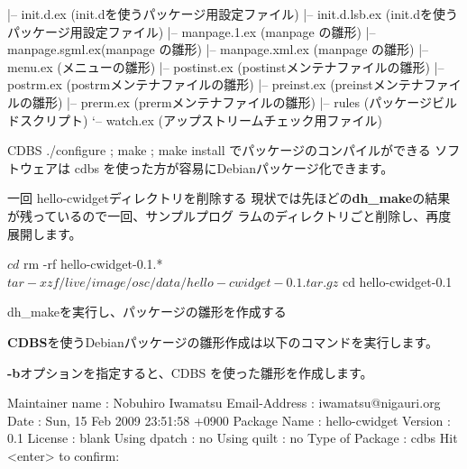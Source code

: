 \begin{frame}[containsverbatim]
\begin{commandline}
|-- init.d.ex      (init.dを使うパッケージ用設定ファイル)
|-- init.d.lsb.ex  (init.dを使うパッケージ用設定ファイル)
|-- manpage.1.ex   (manpage の雛形)
|-- manpage.sgml.ex(manpage の雛形)
|-- manpage.xml.ex (manpage の雛形)
|-- menu.ex        (メニューの雛形)
|-- postinst.ex    (postinstメンテナファイルの雛形)
|-- postrm.ex      (postrmメンテナファイルの雛形)
|-- preinst.ex     (preinstメンテナファイルの雛形)
|-- prerm.ex       (prermメンテナファイルの雛形)
|-- rules          (パッケージビルドスクリプト)
`-- watch.ex       (アップストリームチェック用ファイル)
\end{commandline}
\end{frame}

\begin{frame}{CDBS}
./configure ; make ; make install でパッケージのコンパイルができる
ソフトウェアは cdbs を使った方が容易にDebianパッケージ化できます。
\end{frame}


\begin{frame}[containsverbatim]{一回 hello-cwidgetディレクトリを削除する}
現状では先ほどの{\bf dh\_make}の結果が残っているので一回、サンプルプログ
ラムのディレクトリごと削除し、再度展開します。
\begin{commandline}
$ cd 
$ rm -rf hello-cwidget-0.1.*
$ tar -xzf /live/image/osc/data/hello-cwidget-0.1.tar.gz
$ cd hello-cwidget-0.1
\end{commandline}
\end{frame}

\begin{frame}[containsverbatim]{dh\_makeを実行し、パッケージの雛形を作成する}

{\bf CDBS}を使うDebianパッケージの雛形作成は以下のコマンドを実行します。
{\bf -b}オプションを指定すると、CDBS を使った雛形を作成します。
\end{frame}

\begin{frame}[containsverbatim]
\begin{commandline}
Maintainer name : Nobuhiro Iwamatsu
Email-Address   : iwamatsu@nigauri.org 
Date            : Sun, 15 Feb 2009 23:51:58 +0900
Package Name    : hello-cwidget
Version         : 0.1
License         : blank
Using dpatch    : no
Using quilt     : no
Type of Package : cdbs
Hit <enter> to confirm: 
\end{commandline}
\end{frame}

